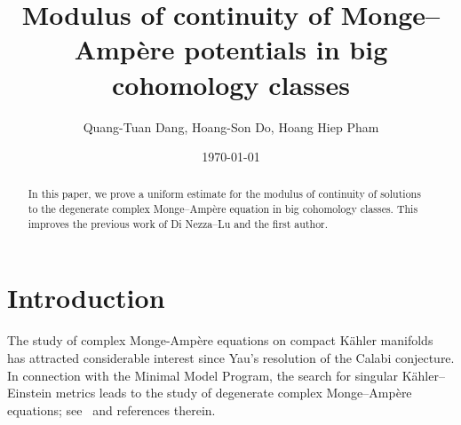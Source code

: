\documentclass[a4paper,11pt]{amsart}
\numberwithin{equation}{section}
\theoremstyle{definition}
\begin{document}
		\title[Modulus of continuity]{Modulus of continuity of Monge--Amp\`ere potentials in big cohomology classes}
	\author{Quang-Tuan Dang, Hoang-Son Do, Hoang Hiep Pham}
	
		
			\address{Yau Mathematical Sciences Center, Tsinghua University, Beijing 100084, China}
  \address{Vietnam Academy of Science and Technology, Institute of Mathematics, 18 Hoang Quoc Viet road, Cau Giay, Hanoi, Vietnam}
  \address{Institute for Artificial Intelligence, University of Engineering and
Technology, Vietnam National University, Hanoi, Vietnam}
	\date{\today}
	





\begin{abstract} In this paper, we prove a uniform estimate for the modulus of continuity of solutions to the degenerate complex Monge--Amp\`ere equation in big cohomology classes. This improves the previous work of Di Nezza--Lu and the first author.
\end{abstract}



\maketitle

\section{Introduction}




The study of complex Monge-Amp\`ere equations on compact K\"ahler manifolds has attracted considerable interest since Yau’s resolution of the Calabi conjecture. In connection with the Minimal Model Program, the search for singular K\"ahler--Einstein metrics
leads to the study of degenerate complex Monge–Amp\`ere equations; see~\cite{eyssidieux2009singular,berman2019kahler,guedj2017degenerate} and references therein.
\end{document}
